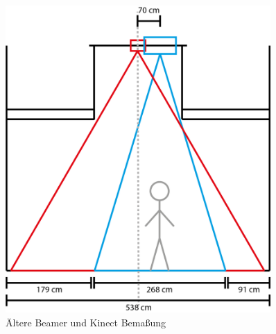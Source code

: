 \begin{figure}[htbp]
	\centering
		\includegraphics[width=0.9\textwidth]{images/TZ2.png}
	\caption{Ältere Beamer und Kinect Bemaßung}
	\label{fig:TZ2}
\end{figure}

